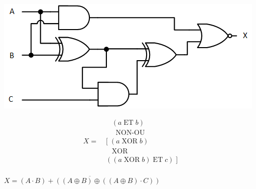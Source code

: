 \documentclass[11pt,a4paper]{article}
\begin{document}
\smallskip

\begin{table}[!ht]
  \centering
  \begin{minipage}{0.55\textwidth}
    \centering

\includegraphics[scale=1.45]{./img/circuit_logique_B.png}

  \end{minipage}
  \hfillx
  \begin{minipage}{0.45\textwidth}
    \centering


\begin{equation*}
    \begin{split}
    &   \; \; \; (a \; \text{ET} \; b) \\
    &     \; \; \; \; \; \text{NON-OU} \\
X = \; & [ \; (a \; \text{XOR} \; b) \\
    &     \; \; \; \text{XOR} \\
    & ((a \; \text{XOR} \; b) \; \text{ET} \; c) \; ] \\
    \end{split}
\end{equation*}

\bigskip

$ X = \overline{(A \cdot B) + ((A \oplus B) \oplus ((A \oplus B) \cdot C))} $

  \end{minipage}
\end{table}



\bigskip
\end{document}

